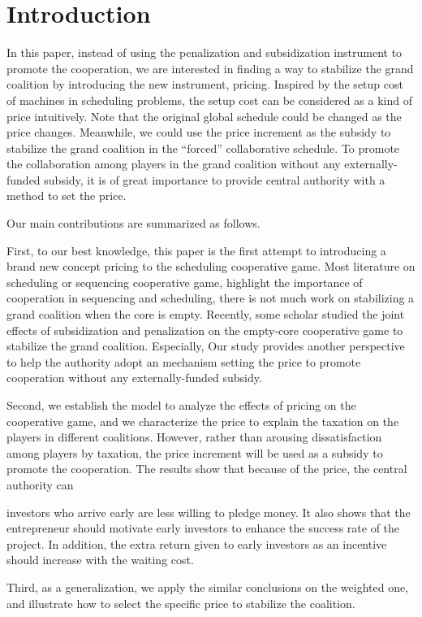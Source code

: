 \section{Introduction}

In this paper, instead of using the penalization and subsidization instrument to promote the cooperation, we are interested in finding a way to stabilize the grand coalition by introducing the new instrument, pricing. Inspired by the setup cost of machines in scheduling problems, the setup cost can be considered as a kind of price intuitively. Note that the original global schedule could be changed as the price changes. Meanwhile, we could use the price increment as the subsidy to stabilize the grand coalition in the “forced” collaborative schedule.
To promote the collaboration among players in the grand coalition without any externally-funded subsidy, it is of great importance to provide central authority with a method to set the price.

Our main contributions are summarized as follows.

First, to our best knowledge, this paper is the first attempt to introducing a brand new concept pricing to the scheduling cooperative game. Most literature on scheduling or sequencing cooperative game, highlight the importance of cooperation in sequencing and scheduling, there is not much work on stabilizing a grand coalition when the core is empty. Recently, some scholar studied the joint effects of subsidization and penalization on the empty-core cooperative game to stabilize the grand coalition. Especially, Our study provides another perspective to help the authority adopt an mechanism setting the price to promote cooperation without any externally-funded subsidy.

Second, we establish the model to analyze the effects of pricing on the cooperative game, and we characterize the price to explain the taxation on the players in different coalitions. However, rather than arousing dissatisfaction among players by taxation, the price increment will be used as a subsidy to promote the cooperation. The results show that because of the price,
the central authority can

investors who arrive early are less willing to pledge money. It also shows that the entrepreneur should motivate early investors to enhance the success rate of the project. In addition, the extra return given to early investors as an incentive should increase with the waiting cost.

Third, as a generalization, we apply the similar conclusions on the weighted one,
and illustrate how to select the specific price to stabilize the coalition.

